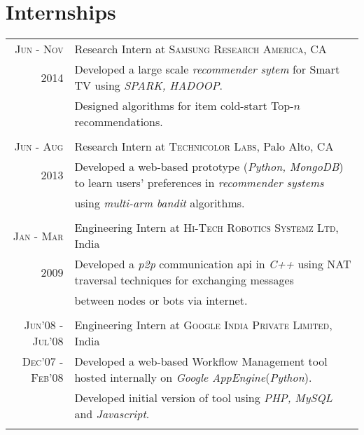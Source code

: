 \documentclass[a4paper,10pt]{article}
\begin{document}
\section{Internships}
\begin{tabular}{r|l}
  

  \textsc{Jun - Nov} & Research Intern at \textsc{Samsung Research America}, CA\\
  \textsc{2014}       &\footnotesize{Developed a large scale \textit{recommender
                       sytem} for Smart TV using
                     \textit{SPARK, HADOOP}.}\\
                    & \footnotesize{Designed algorithms for 
                   item cold-start Top-$n$ recommendations.}\\\multicolumn{2}{c}{} \\

  \textsc{Jun - Aug} & Research Intern at \textsc{Technicolor Labs}, Palo Alto, CA \\
  \textsc{2013} &\footnotesize{Developed a web-based  prototype (\emph{Python,
                 MongoDB}) to learn users'
               preferences in \emph{recommender systems}}\\
               &\footnotesize{using
               \emph{multi-arm bandit} algorithms.} \\\multicolumn{2}{c}{} \\ %

  \textsc{Jan - Mar} & Engineering Intern at \textsc{Hi-Tech Robotics
                 Systemz Ltd}, India \\
  \textsc{2009}      &\footnotesize{Developed a \emph{p2p} communication api in
                 \emph{C++}
               using NAT traversal techniques for exchanging
             messages}\\ 
             &\footnotesize{between nodes or bots via internet.} \\\multicolumn{2}{c}{} \\

  \textsc{Jun'08 - Jul'08} & Engineering Intern at \textsc{Google India Private
             Limited}, India \\
  \textsc{Dec'07 - Feb'08}  &\footnotesize{Developed a web-based Workflow Management
             tool hosted internally on \emph{Google AppEngine}(\emph{Python})}.\\
             &\footnotesize{Developed initial version of tool using \emph{PHP,
     MySQL} and \emph{Javascript}.} \\\multicolumn{2}{c}{} \\
  
\end{tabular}
\end{document}
